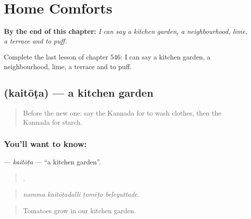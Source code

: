 
\chapter{Home Comforts}
\label{ch:ka-home-comforts}

\begin{chapteropening}
\textbf{By the end of this chapter:} \emph{I can say a kitchen garden, a neighbourhood, lime, a terrace and to puff.}

Complete the last lesson of chapter 546: I can say a kitchen garden, a neighbourhood, lime, a terrace and to puff.
\end{chapteropening}

\section[\texorpdfstring{\kn{ಕೈತೋಟ} (kaitōṭa)}{ಕೈತೋಟ (kaitōṭa)}]{ (kaitōṭa) — a kitchen garden}

\label{lesson:KA-C546-kaitota}



\begin{quote}
Before the new one: say the Kannada for to wash clothes, then the Kannada for starch.
\end{quote}

\subsection*{You'll want to know: }
\textbf{} — \emph{kaitōṭa} — \textquotedblleft{}a kitchen garden\textquotedblright{}.

\begin{quote}
   .
\end{quote}

\begin{quote}
\emph{namma kaitōṭadalli ṭomēṭo beḷeyuttade.}
\end{quote}

\begin{quote}
Tomatoes grow in our kitchen garden.
\end{quote}

